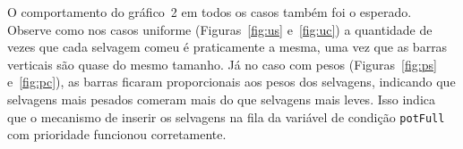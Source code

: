 \documentclass[11pt,a4paper]{article}
\begin{document}
O comportamento do gráfico~2 em todos os casos também foi o esperado. Observe como nos casos 
uniforme (Figuras~\ref{fig:us} e~\ref{fig:uc}) a quantidade de vezes que cada selvagem comeu é 
praticamente a mesma, uma vez que as barras verticais são quase do mesmo tamanho. Já no caso com 
pesos (Figuras~\ref{fig:ps} e~\ref{fig:pc}), as barras ficaram proporcionais aos pesos dos 
selvagens, indicando que selvagens mais pesados comeram mais do que selvagens mais leves. Isso 
indica que o mecanismo de inserir os selvagens na fila da variável de condição \verb|potFull| com 
prioridade funcionou corretamente.


\end{document}
